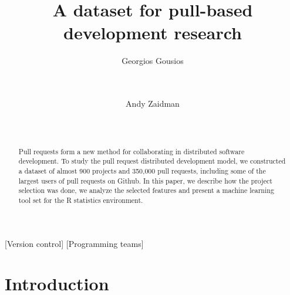 \documentclass{sig-alternate}
\begin{document}
\newcommand{\todo}[1]{\textbf{TODO}\footnote{\textbf{TODO:} #1}}

\newcommand{\ghtorrent}{\textsc{ght}orrent\xspace}
\newcommand{\api}{\textsc{api}\xspace}
\newcommand{\pullreqs}{\textsf{pullreqs}\xspace}

\title{A dataset for pull-based development research}

\author{
\alignauthor
Georgios Gousios\\
       \\
       \\
\and
Andy Zaidman\\
       \\
       \\
}

\maketitle

\begin{abstract}

Pull requests form a new method for collaborating in distributed software
development. To study the pull request distributed development model, we
constructed a dataset of almost 900 projects and 350,000 pull requests, 
including some of the largest
users of pull requests on Github. In this paper, we describe how the project
selection was done, we analyze the selected features and present a machine
learning tool set for the R statistics environment. 

\end{abstract}

[Version control]
[Programming teams]



\section{Introduction}
\label{sec:intro}
\end{document}
